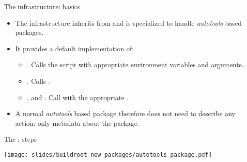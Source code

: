 \begin{frame}{The  infrastructure: basics}

  \begin{itemize}
  \item The  infrastructure inherits from
     and is specialized to handle {\em
      autotools} based packages.
  \item It provides a default implementation of:
    \begin{itemize}
    \item {}. Calls the 
      script with appropriate environment variables and arguments.
    \item {}. Calls .
    \item {},
       and
      . Call  with the
      appropriate .
    \end{itemize}
  \item A normal {\em autotools} based package therefore does not need
    to describe any action: only metadata about the package.
  \end{itemize}
\end{frame}

\begin{frame}{The : steps}
  \begin{center}
    \texttt{[image: slides/buildroot-new-packages/autotools-package.pdf]}
  \end{center}
\end{frame}

